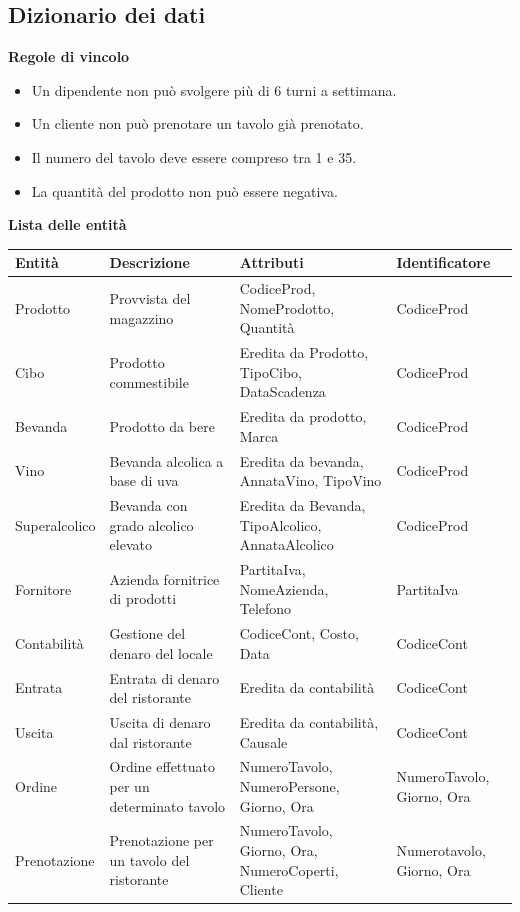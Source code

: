 \subsection{Dizionario dei dati}

\textbf{Regole di vincolo} 
\begin{itemize}
    \item Un dipendente non può svolgere più di 6 turni a settimana.
    \item Un cliente non può prenotare un tavolo già prenotato.
    \item Il numero del tavolo deve essere compreso tra 1 e 35.
    \item La quantità del prodotto non può essere negativa.
\end{itemize}

\textbf{Lista delle entità}
\begin{longtable}{p{2.5cm} p{4cm} p{5cm} p{2.5cm}}
    \toprule
    \textbf{Entità} & \textbf{Descrizione} &   \textbf{Attributi} & \textbf{Identificatore}\\ \midrule
    Prodotto & Provvista del magazzino & CodiceProd, NomeProdotto, Quantità & CodiceProd\\ \midrule
    Cibo & Prodotto commestibile & Eredita da Prodotto, TipoCibo, DataScadenza & CodiceProd \\ \midrule
    Bevanda	& Prodotto da bere & Eredita da prodotto, Marca & CodiceProd\\ \midrule
    Vino & Bevanda alcolica a base di uva & Eredita da bevanda, AnnataVino, TipoVino & CodiceProd \\ \midrule
    Superalcolico & Bevanda con grado alcolico elevato & Eredita da Bevanda, TipoAlcolico, AnnataAlcolico & CodiceProd \\ \midrule
    Fornitore & Azienda fornitrice di prodotti & PartitaIva, NomeAzienda, Telefono & PartitaIva \\ \midrule
    Contabilità & Gestione del denaro del locale & CodiceCont, Costo, Data &CodiceCont \\ \midrule
    Entrata & Entrata di denaro del ristorante & Eredita da contabilità & CodiceCont \\ \midrule
    Uscita & Uscita di denaro dal ristorante & Eredita da contabilità, Causale & CodiceCont \\ \midrule
    Ordine & Ordine effettuato per un determinato tavolo & NumeroTavolo, NumeroPersone, Giorno, Ora & NumeroTavolo, Giorno, Ora\\ \midrule
    Prenotazione & Prenotazione per un tavolo del ristorante & NumeroTavolo, Giorno, Ora, NumeroCoperti, Cliente & Numerotavolo, Giorno, Ora \\ \midrule

\end{longtable}
